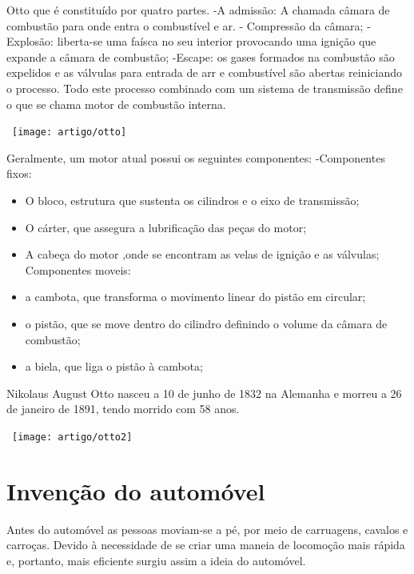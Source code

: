 \documentclass{report}
\begin{document}
Otto que é constituído por quatro partes.
-A admissão: A chamada câmara de combustão para onde entra o combustível e ar.
- Compressão da câmara;
-Explosão: liberta-se uma faísca no seu interior provocando uma ignição que expande a câmara de combustão;
-Escape: os gases formados na combustão são expelidos e as válvulas para entrada de arr e combustível são abertas reiniciando o processo.
	Todo este processo combinado com um sistema de transmissão define o que se chama motor de combustão interna.
\begin{center}
\ \texttt{[image: artigo/otto]}
\end{center}
 \begin{figure}[h]
 	\centerline{}
 \end{figure}

\pagebreak
Geralmente, um motor atual possui os seguintes componentes:
-Componentes fixos:
\begin{itemize}

\item O bloco, estrutura que sustenta os cilindros e o eixo de transmissão;
\item O cárter, que assegura a lubrificação das peças do motor;
\item A cabeça do motor ,onde se encontram as velas de ignição e as válvulas;
Componentes moveis:
\item a cambota, que transforma o movimento linear do pistão em circular;
\item o pistão, que se move dentro do cilindro definindo o volume da câmara de combustão;
\item a biela, que liga o pistão à cambota;
\end{itemize}

Nikolaus August Otto nasceu a 10 de junho de 1832 na Alemanha e morreu a 26 de janeiro de 1891, tendo morrido com 58 anos.

\begin{center}
\ \texttt{[image: artigo/otto2]}
\end{center}
 \begin{figure}[h]
 	\centerline{}
 \end{figure}

\chapter{Invenção do automóvel}
Antes do automóvel as pessoas moviam-se a pé, por meio de carruagens, cavalos e carroças. Devido à necessidade de se criar uma maneia de locomoção mais rápida e, portanto, mais eficiente surgiu assim a ideia do automóvel.
\end{document}
